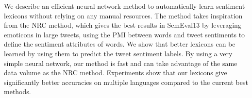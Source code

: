 We describe an efficient neural network method to automatically learn sentiment lexicons without relying on any manual resources. The method takes inspiration from the NRC method, which gives the best results in SemEval13 by leveraging emoticons in large tweets, using the PMI between words and tweet sentiments to define the sentiment attributes of words. We show that better lexicons can be learned by using them to predict the tweet sentiment labels. By using a very simple neural network, our method is fast and can take advantage of the same data volume as the NRC method. Experiments show that our lexicons give significantly better accuracies on multiple languages compared to the current best methods.
